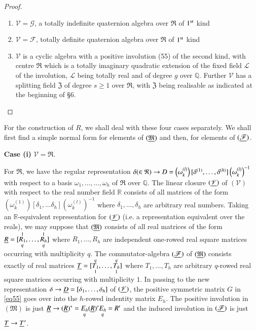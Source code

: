 \begin{proof}
\begin{enumerate}
\item $\mathscr{V} = \mathcal{G}$, a totally indefinite quaternion
  algebra over $\mathfrak{R}$ of $1^{\rm st}$ kind 

\item $\mathscr{V} = \mathscr{F}$, totally definite quaternion algebra
  over $\mathfrak{R}$ of $1^{\rm st}$ kind 

\item $\mathscr{V}$ is a cyclic algebra with a positive involution
  (55) of the second kind, with centre $\mathfrak{R}$ which is a
  totally imaginary quadratic extension of the fixed field
  $\mathscr{L}$ of the involution, $\mathscr{L}$ being totally real
  and of degree $g$ over $\mathbb{Q}$. Further $\mathscr{V}$ has a
  splitting field $\mathfrak{Z}$ of degree $s\geq 1$ over
  $\mathfrak{R}$, with $\mathfrak{Z}$ being realisable as indicated at
  the beginning of \S 6.
\end{enumerate}
\end{proof}

For the construction of $R$, we shall deal with these four cases
separately. We shall first find a simple normal form for elements of
$(\underline{\mathfrak{M}})$ and then, for elements of
$(\underline{\mathscr{F}})$. 

\medskip
\noindent
{\rm \bf{Case} (i)} $\mathscr{V} = \mathfrak{R}$.

For $\mathfrak{R}$, we have the regular representation $\delta (\in
\mathfrak{R}) \rightarrow D =
\left(\omega^{(l)}_k\right)[\delta^{(1)},\break\ldots, \delta^{(h)}]
\left(\omega^{(l)}_k\right)^{-1}$ with respect to a basis
$\omega_1,\ldots, \ldots, \omega_h$ of $\mathfrak{R}$ over
$\mathbb{Q}$. The linear closure $(\underline{\mathscr{V}})$ of
$(\mathscr{V})$ with respect to the real number field $\mathbb{R}$
consists of all matrices of the form
$\left(\omega^{(1)}_k\right)[\delta_1,\ldots \delta_h]
\left(\omega^{(l)}_k\right)^{-1}$ \pageoriginale where
$\delta_1,\ldots,\delta_h$ are arbitrary real numbers. Taking an
$\mathbb{R}$-equivalent representation for $(\underline{\mathscr{V}})$
(i.e. a representation equivalent over the reals), we may suppose that
$(\underline{\mathfrak{M}})$ consists of all real matrices of the form
$\underline{R}=[\overset{1}{\underset{q}{R_{1}}},\ldots,
  \overset{1}{\underset{q}{R_{h}}} ]$ where $R_1,\ldots, R_h$ are
independent one-rowed real square matrices occurring with multiplicity
$q$. The commutator-algebra $(\underline{\mathscr{F}})$ of
$(\underline{\mathfrak{M}})$ consists exactly of real matrices $\underline{T} = [
  \overset{q}{\underset{1}{T_1}},\ldots,
  \overset{q}{\underset{1}{T_{h}}} ]$ where $T_1,\ldots, T_h$ are
arbitrary $q$-rowed real square matrices occurring with multiplicity
$1$. In passing to the new representation $\delta \rightarrow \underline{D} =
[\delta_1,\ldots, \delta_h]$ of $(\underline{\mathscr{V}})$, the positive
symmetric matrix $G$ in \eqref{eq55} goes over into the $h$-rowed indentity
matrix $E_h$. The positive involution in $(\mathfrak{M})$ is just
$\underline{R} \rightarrow (\underline{R})^{\ast} = \underset{q}{E_h}(\underline{R})'
\underset{q}{E_h} = R'$ and the induced involution in
$(\underline{\mathscr{F}})$ is just $\underline{T}\rightarrow \underline{T}'$.

